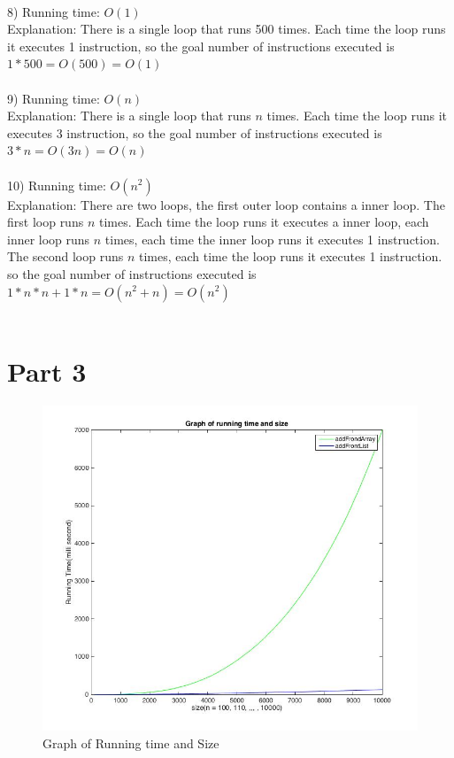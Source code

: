 \documentclass[12pt]{article}
\begin{document}
\\
8) Running time: $O(1)$\\
Explanation: There is a single loop that runs 500 times. Each time the loop runs it executes 1 instruction, so the goal number  of instructions executed is $1*500 = O(500) = O(1)$\\
\\
9) Running time: $O(n)$\\
Explanation: There is a single loop that runs $n$ times. Each time the loop runs it executes 3 instruction, so the goal number  of instructions executed is $3*n = O(3n) = O(n)$\\
\\
10) Running time: $O(n^2)$\\
Explanation: There are two loops, the first outer loop contains a inner loop. The first loop runs $n$ times. Each time the loop runs it executes a inner loop, each inner loop runs $n$ times, each time the inner loop runs it executes 1 instruction. The second loop runs $n$ times, each time the loop runs it executes 1 instruction. so the goal number of instructions executed is $1*n*n + 1*n= O(n^2 + n) = O(n^2)$\\
\\
\section*{Part 3}
\begin{figure}[h!]
  \includegraphics[width=\linewidth]{hw3.jpg}
  \caption{Graph of Running time and Size}
  \label{fig:Running Time}
\end{figure}
\end{document}
